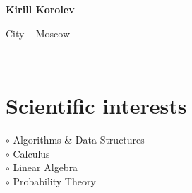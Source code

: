 \documentclass[a4paper,10pt]{article}
\begin{document}
\thispagestyle{empty}

\begin{adjustbox}{valign=t}
\begin{minipage}{0.3\textwidth} %
\begin{center}

\MySkip 	%

{\LARGE \bfseries Kirill Korolev}

\MySkip 	%

City -- Moscow\\

\MySkip 	%

\textcolor{ColorTwo}{\faEnvelopeO} 
 \\

\textcolor{ColorTwo}{\faChain} 
\end{center}

\vfill

\section*{Scientific interests}
\raggedright
\textcolor{ColorOne}{$\circ$} Algorithms \& Data Structures\\
\textcolor{ColorOne}{$\circ$} Calculus\\
\textcolor{ColorOne}{$\circ$} Linear Algebra\\
\textcolor{ColorOne}{$\circ$} Probability Theory


\end{minipage}
\end{adjustbox}
\end{document}
